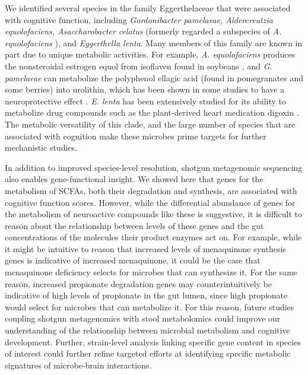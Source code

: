 \documentclass{article}
\begin{document}
We identified several species in the family Eggerthelaceae that were
associated with cognitive function, including \emph{Gordonibacter
pamelaeae, Aldercreutzia equolofaciens, Asaccharobacter celatus}
(formerly regarded a subspecies of \emph{A. equolofaciens}
\cite{takahashiCompleteGenomeSequence2021}),
and \emph{Eggerthella lenta}. Many members of this family are
known in part due to unique metabolic activities. For example, \emph{A.
equolofaciens} produces the nonsteroidal estrogen equol from isoflaven
found in soybeans
\cite{wangEnantioselectiveSynthesisSEquol2005},
and \emph{G. pamelaeae} can metabolize the polyphenol ellagic acid
(found in pomegranates and some berries) into urolithin, which has been
shown in some studies to have a neuroprotective effect
\cite{gongUrolithinAlleviatesBloodbrain2022,selmaDescriptionUrolithinProduction2014}.
\emph{E. lenta} has been extensively studied for
its ability to metabolize drug compounds such as the plant-derived heart
medication digoxin
\cite{haiserPredictingManipulatingCardiac2013}.
The metabolic versatility of this clade, and the large number of
species that are associated with cognition make these microbes prime
targets for further mechanistic studies.

In addition to improved species-level resolution, shotgun metagenomic
sequencing also enables gene-functional insight. We showed here that
genes for the metabolism of SCFAs, both their degradation and synthesis,
are associated with cognitive function scores. However, while the
differential abundance of genes for the metabolism of neuroactive
compounds like these is suggestive, it is difficult to reason about the
relationship between levels of these genes and the gut concentrations of
the molecules their product enzymes act on. For example, while it might
be intuitive to reason that increased levels of menaquinone synthesis
genes is indicative of increased menaquinone, it could be the case that
menaquinone deficiency selects for microbes that can synthesize it. For
the same reason, increased propionate degradation genes may
counterintuitively be indicative of high levels of propionate in the gut
lumen, since high propionate would select for microbes that can
metabolize it. For this reason, future studies coupling shotgun
metagenomics with stool metabolomics could improve our understanding of
the relationship between microbial metabolism and cognitive development.
Further, strain-level analysis linking specific gene content in species
of interest could further refine targeted efforts at identifying
specific metabolic signatures of microbe-brain interactions.
\end{document}

